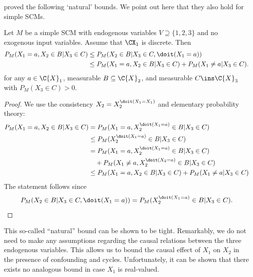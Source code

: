 \cite{ManskiNagin1998} proved the following `natural' bounds. We point out here that they also hold for simple SCMs.
\begin{Thm}\label{thm:natural_bounds}
  Let $M$ be a simple SCM with endogenous variables $V \supseteq \{1,2,3\}$ and no exogenous input variables.
  Assume that $\CX_1$ is discrete.
  Then
  \begin{equation}\label{eq:natural_bounds}\begin{split}
    P_M(X_1=a,X_2 \in B|X_3 \in C) &\le P_M(X_2\in B|X_3 \in C, \doit(X_1=a)) \\
                   &\le P_M(X_1=a,X_2\in B|X_3 \in C) + P_M(X_1\ne a|X_3 \in C).
  \end{split}\end{equation}
  for any $a\in\C{X}_1$, measurable $B \subseteq \C{X}_2$, and measurable $C \ins \C{X}_3$ with $P_M(X_3 \in C) > 0$.
\end{Thm}
\begin{proof}
  We use the consistency $X_2=X_2^{\doit(X_1=X_1)}$ and elementary probability theory:
    \begin{align*}
      P_M(X_1=a,X_2\in B|X_3 \in C) 
      &= P_M(X_1=a,X_2^{\doit(X_1=a)}\in B|X_3 \in C) \\
      &\le P_M(X_2^{\doit(X_1=a)}\in B|X_3 \in C) \\
      &= P_M(X_1=a,X_2^{\doit(X_1=a)}\in B|X_3 \in C) \\
      & \quad + P_M(X_1\ne a,X_2^{\doit(X_2=a)}\in B|X_3 \in C) \\
      &\le P_M(X_1=a,X_2\in B|X_3 \in C) + P_M(X_1 \ne a|X_3 \in C)
    \end{align*}
  The statement follows since
  $$ P_M(X_2\in B|X_3 \in C, \doit(X_1=a)) = P_M(X_2^{\doit(X_1=a)}\in B|X_3 \in C).$$
\end{proof}
This so-called ``natural'' bound can be shown to be tight. 
Remarkably, we do not need to make any assumptions regarding the causal relations between the three endogenous variables.
This allows us to bound the causal effect of $X_1$ on $X_2$ in the presence of confounding and cycles.
Unfortunately, it can be shown that there exists no analogous bound in case $X_1$ is real-valued.

